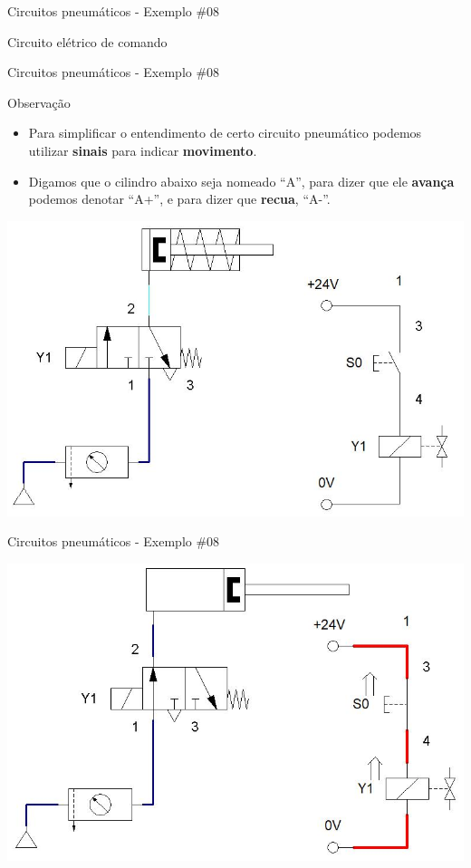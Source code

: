 \begin{frame}{Circuitos pneumáticos - Exemplo \#08}
\begin{minipage}{0.48\linewidth}
		Circuito elétrico de comando
	\end{minipage}
	
\end{frame}


\begin{frame}{Circuitos pneumáticos - Exemplo \#08}
	\begin{block}{Observação}
		\begin{itemize}
			\item Para simplificar o entendimento de certo circuito pneumático podemos utilizar \textbf{sinais} para indicar \textbf{movimento}.
			\item Digamos que o cilindro abaixo seja nomeado ``A'', para dizer que ele \textbf{avança} podemos denotar ``A+'', e para dizer que \textbf{recua}, ``A-''.
		\end{itemize}
	\end{block}
	
	\medskip
	
	\centering
	\includegraphics[height=0.55\textheight]{Figuras/Ch14/fig49n2}
	
\end{frame}


\begin{frame}{Circuitos pneumáticos - Exemplo \#08}
	
	\centering
	\includegraphics[width=0.9\linewidth]{Figuras/Ch14/fig49n3}
	
\end{frame}


